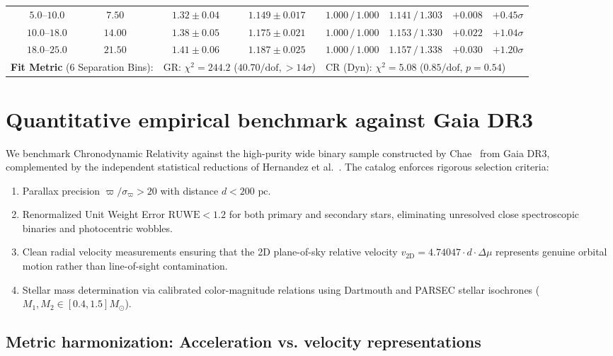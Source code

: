 \documentclass[aps,prd,reprint,superscriptaddress,nofootinbib,floatfix,amsmath,amssymb]{revtex4-2}
\begin{document}
\begin{table}[t]
\begin{ruledtabular}
\begin{tabular}{ccccccccc}
$5.0\text{--}10.0$ & $7.50$ & & $1.32 \pm 0.04$ & $1.149 \pm 0.017$ & $1.000 \,/\, 1.000$ & $1.141 \,/\, 1.303$ & $+0.008$ & $+0.45\sigma$ \\
$10.0\text{--}18.0$ & $14.00$ & & $1.38 \pm 0.05$ & $1.175 \pm 0.021$ & $1.000 \,/\, 1.000$ & $1.153 \,/\, 1.330$ & $+0.022$ & $+1.04\sigma$ \\
$18.0\text{--}25.0$ & $21.50$ & & $1.41 \pm 0.06$ & $1.187 \pm 0.025$ & $1.000 \,/\, 1.000$ & $1.157 \,/\, 1.338$ & $+0.030$ & $+1.20\sigma$ \\
\hline
\multicolumn{3}{l}{\textbf{Fit Metric} (6 Separation Bins):} & \multicolumn{2}{l}{GR: $\chi^2 = 244.2$ ($40.70/\text{dof}, >14\sigma$)} & \multicolumn{4}{l}{CR (Dyn): $\chi^2 = \mathbf{5.08}$ ($0.85/\text{dof}$, $p = 0.54$)} \\
\end{tabular}
\end{ruledtabular}
\end{table}

\section{Quantitative empirical benchmark against Gaia DR3}
\label{sec:gaia_benchmark}

We benchmark Chronodynamic Relativity against the high-purity wide binary sample constructed by Chae~\cite{chae2023breakdown,chae2024robust} from Gaia DR3, complemented by the independent statistical reductions of Hernandez et al.~\cite{hernandez2023internal}. The catalog enforces rigorous selection criteria:
\begin{enumerate}
\item Parallax precision $\varpi / \sigma_\varpi > 20$ with distance $d < 200\text{ pc}$.
\item Renormalized Unit Weight Error $\text{RUWE} < 1.2$ for both primary and secondary stars, eliminating unresolved close spectroscopic binaries and photocentric wobbles.
\item Clean radial velocity measurements ensuring that the 2D plane-of-sky relative velocity $v_{\text{2D}} = 4.74047 \cdot d \cdot \Delta\mu$ represents genuine orbital motion rather than line-of-sight contamination.
\item Stellar mass determination via calibrated color-magnitude relations using Dartmouth and PARSEC stellar isochrones ($M_1, M_2 \in [0.4, 1.5] M_\odot$).
\end{enumerate}

\subsection{Metric harmonization: Acceleration vs. velocity representations}
\label{subsec:metric_harmonization}
\end{document}
